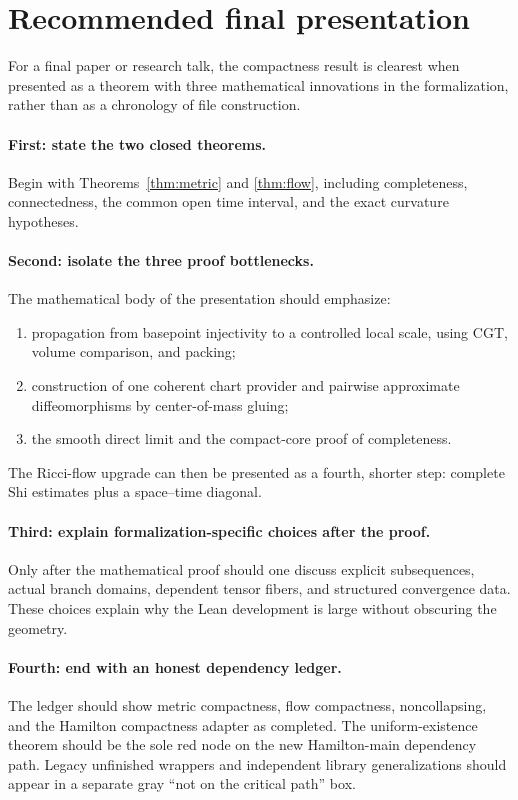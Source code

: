 \documentclass[11pt]{article}
\theoremstyle{plain}
\theoremstyle{definition}
\theoremstyle{remark}
\begin{document}
\section{Recommended final presentation}

For a final paper or research talk, the compactness result is clearest when
presented as a theorem with three mathematical innovations in the
formalization, rather than as a chronology of file construction.

\paragraph{First: state the two closed theorems.}
Begin with Theorems~\ref{thm:metric} and \ref{thm:flow}, including
completeness, connectedness, the common open time interval, and the exact
curvature hypotheses.

\paragraph{Second: isolate the three proof bottlenecks.}
The mathematical body of the presentation should emphasize:
\begin{enumerate}[leftmargin=2em]
  \item propagation from basepoint injectivity to a controlled local scale,
  using CGT, volume comparison, and packing;
  \item construction of one coherent chart provider and pairwise
  approximate diffeomorphisms by center-of-mass gluing;
  \item the smooth direct limit and the compact-core proof of completeness.
\end{enumerate}
The Ricci-flow upgrade can then be presented as a fourth, shorter step:
complete Shi estimates plus a space--time diagonal.

\paragraph{Third: explain formalization-specific choices after the proof.}
Only after the mathematical proof should one discuss explicit subsequences,
actual branch domains, dependent tensor fibers, and structured convergence
data.  These choices explain why the Lean development is large without
obscuring the geometry.

\paragraph{Fourth: end with an honest dependency ledger.}
The ledger should show metric compactness, flow compactness,
noncollapsing, and the Hamilton compactness adapter as completed.  The
uniform-existence theorem should be the sole red node on the new
Hamilton-main dependency path.  Legacy unfinished wrappers and independent
library generalizations should appear in a separate gray ``not on the
critical path'' box.
\end{document}
